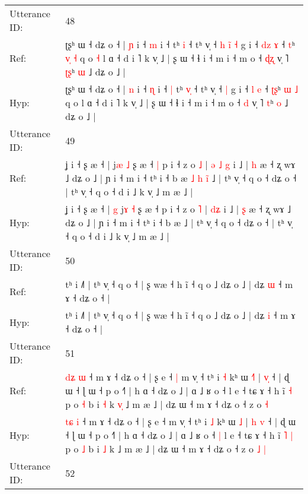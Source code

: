 \documentclass[10pt]{article}
\DeclareRobustCommand{\hl}[1]{{\textcolor{red}{#1}}}
\begin{document}
\begin{longtable}{ll}
\midrule
Utterance ID: & 48 \\
Ref: & ʈʂʰ ɯ ˧ dʑ o ˧ | \hl{ɲ} i ˧ \hl{m} i ˧\hl{}\hl{} tʰ \hl{}\hl{i} ˧ tʰ v̩ ˧\hl{ }\hl{h}\hl{ }\hl{i}\hl{̃} \hl{˧} g i ˧ \hl{d}\hl{z} \hl{ɤ} ˧ \hl{}\hl{t}ʰ \hl{v}\hl{̩} \hl{˧} q o\hl{ }\hl{˧} l ɑ ˧ d i ˥ k v̩ ˩ | ʂ ɯ ˧ ɬ i ˧ m i ˧ m o ˧ \hl{ɖ}\hl{ʐ} v̩ ˥ \hl{ʈ}\hl{ʂ}ʰ \hl{ɯ} ˩ dʑ o ˩ |
 \\
Hyp: & ʈʂʰ ɯ ˧ dʑ o ˧ | \hl{n} i ˧ \hl{ɳ} i ˧\hl{ }\hl{|} tʰ \hl{v}\hl{̩} ˧ tʰ v̩ ˧\hl{}\hl{}\hl{}\hl{}\hl{} \hl{|} g i ˧ \hl{}\hl{l} \hl{e} ˧ \hl{ʈ}\hl{ʂ}ʰ \hl{}\hl{ɯ} \hl{˩} q o\hl{}\hl{} l ɑ ˧ d i ˥ k v̩ ˩ | ʂ ɯ ˧ ɬ i ˧ m i ˧ m o ˧ \hl{}\hl{d} v̩ ˥ \hl{}\hl{t}ʰ \hl{o} ˩ dʑ o ˩ |
 \\
\midrule
Utterance ID: & 49 \\
Ref: & ʝ i ˧ ʂ æ ˧ |\hl{}\hl{} j\hl{æ} \hl{˩} ʂ æ ˧\hl{ }\hl{|} p i ˧ z o \hl{˩} |\hl{ }\hl{ə} \hl{˩}\hl{ }\hl{g} i ˩ | \hl{h} æ ˧ ʐ wɤ ˩ dʑ o ˩ | ɲ i ˧ m i ˧ tʰ i ˧ b æ\hl{ }\hl{˩}\hl{ }\hl{h}\hl{ }\hl{i}\hl{̃} ˩ | tʰ v̩ ˧ q o ˧ dʑ o ˧ | tʰ v̩ ˧ q o ˧ d i ˩ k v̩ ˩ m æ ˩ |
 \\
Hyp: & ʝ i ˧ ʂ æ ˧ |\hl{ }\hl{g} j\hl{ɤ} \hl{˧} ʂ æ ˧\hl{}\hl{} p i ˧ z o \hl{˥} |\hl{}\hl{} \hl{}\hl{d}\hl{ʑ} i ˩ | \hl{ʂ} æ ˧ ʐ wɤ ˩ dʑ o ˩ | ɲ i ˧ m i ˧ tʰ i ˧ b æ\hl{}\hl{}\hl{}\hl{}\hl{}\hl{}\hl{} ˩ | tʰ v̩ ˧ q o ˧ dʑ o ˧ | tʰ v̩ ˧ q o ˧ d i ˩ k v̩ ˩ m æ ˩ |
 \\
\midrule
Utterance ID: & 50 \\
Ref: & tʰ i ˩˥ | tʰ v̩ ˧ q o ˧ | ʂ wæ ˧ h ĩ ˧ q o ˩ dʑ o ˩ | dʑ \hl{ɯ} ˧ m ɤ ˧ dʑ o ˧ |
 \\
Hyp: & tʰ i ˩˥ | tʰ v̩ ˧ q o ˧ | ʂ wæ ˧ h ĩ ˧ q o ˩ dʑ o ˩ | dʑ \hl{i} ˧ m ɤ ˧ dʑ o ˧ |
 \\
\midrule
Utterance ID: & 51 \\
Ref: & \hl{d}\hl{ʑ} \hl{ɯ} ˧ m ɤ ˧ dʑ o ˧ | ʂ e ˧\hl{ }\hl{|} m v̩ ˧ tʰ i \hl{˧} kʰ ɯ \hl{˧}\hl{˥} | \hl{}\hl{v}\hl{̩} ˧ | ɖ ɯ ˧ ɭ ɯ ˧ p o ˧˥ | h ɑ ˧ dʑ o ˩ | ɑ ˩ ʁ o ˧\hl{}\hl{} l e ˧ tɕ ɤ ˧ h ĩ\hl{}\hl{} \hl{˧} p o \hl{˧} b i \hl{˧} k\hl{ }\hl{v}\hl{̩} ˩ m æ ˩ | dʑ ɯ ˧ m ɤ ˧ dʑ o ˧ z o\hl{}\hl{} \hl{˧}
 \\
Hyp: & \hl{t}\hl{ɕ} \hl{i} ˧ m ɤ ˧ dʑ o ˧ | ʂ e ˧\hl{}\hl{} m v̩ ˧ tʰ i \hl{˩} kʰ ɯ \hl{}\hl{˩} | \hl{h}\hl{ }\hl{v} ˧ | ɖ ɯ ˧ ɭ ɯ ˧ p o ˧˥ | h ɑ ˧ dʑ o ˩ | ɑ ˩ ʁ o ˧\hl{ }\hl{|} l e ˧ tɕ ɤ ˧ h ĩ\hl{ }\hl{˥} \hl{|} p o \hl{˩} b i \hl{˩} k\hl{}\hl{}\hl{} ˩ m æ ˩ | dʑ ɯ ˧ m ɤ ˧ dʑ o ˧ z o\hl{ }\hl{˩} \hl{|}
 \\
\midrule
Utterance ID: & 52 \\

\end{longtable}
\end{document}
